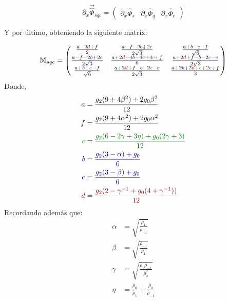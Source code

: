 \begin{equation}
     \partial_{x} \vec{\hat{\Phi}}_{sqc}^{}  = \begin{pmatrix}
\partial_{x} \hat{\Phi}_{s} & \partial_{x} \hat{\Phi}_{q} & \partial_{x} \hat{\Phi}_{c}
\end{pmatrix} 
\end{equation}

Y por último, obteniendo la siguiente matrix:

\begin{equation}
    \mathbb{M}_{sqc} = \begin{pmatrix}
                   \frac{a-2\textcolor{myred}{d}+f}{2} & \frac{a-f-2\textcolor{myblue}{b}+2\textcolor{myblue}{e}}{2\sqrt{3}} & \frac{a+\textcolor{myblue}{b}-\textcolor{myblue}{e}-f}{\sqrt{6}} \\
                    \frac{a-f-2\textcolor{myblue}{b}+2\textcolor{myblue}{e}}{2\sqrt{3}} & \frac{a+2\textcolor{myred}{d}-4\textcolor{myblue}{b}-4\textcolor{myblue}{e}+4\textcolor{mygreen}{c}+f}{6} & \frac{a+2\textcolor{myred}{d}+f-\textcolor{myblue}{b}-2\textcolor{mygreen}{c}-\textcolor{myblue}{e}}{2\sqrt{3}} \\
                    \frac{a+\textcolor{myblue}{b}-\textcolor{myblue}{e}-f}{\sqrt{6}} & \frac{a+2\textcolor{myred}{d}+f-\textcolor{myblue}{b}-2\textcolor{mygreen}{c}-\textcolor{myblue}{e}}{2\sqrt{3}} & \frac{a+2\textcolor{myblue}{b}+2\textcolor{myred}{d}+\textcolor{mygreen}{c}+2\textcolor{myblue}{e}+f}{3} 
            \end{pmatrix}
\end{equation}
Donde,
\begin{align*}
    a &= \frac{g_2(9+4\beta^2) +2g_0 \beta^2}{12} \\
    f &= \frac{g_2(9+4\alpha^2) +2g_0 \alpha^2}{12}\\
    \textcolor{mygreen}{c} &= \textcolor{mygreen}{ \frac{g_2(6-2\gamma +3\eta)+g_0(2\gamma+3)}{12}} \\
    \textcolor{myblue}{b} &= \textcolor{myblue}{ \frac{g_2(3-\alpha)+g_0}{6}} \\
    \textcolor{myblue}{e} &= \textcolor{myblue}{ \frac{g_2(3-\beta)+g_0}{6} } \\
    \textcolor{myred}{d} &= \textcolor{myred}{ \frac{g_2(2-\gamma^{-1} +g_0(4+\gamma^{-1}))}{12}}
\end{align*}
Recordando además que:
\begin{align*}
    \alpha &= \sqrt{\frac{\bar{\rho}_1}{\bar{\rho}_{-1}}} \\
    \beta &=  \sqrt{\frac{\bar{\rho}_{-1}}{\bar{\rho}_1}} \\
    \gamma &= \sqrt{\frac{\bar{\rho}_1 \bar{\rho}_{-1}}{\bar{\rho}_0^2}} \\
    \eta &= \frac{\bar{\rho}_0}{\bar{\rho}_1} + \frac{\bar{\rho}_0}{\bar{\rho}_{-1}} \\
\end{align*}



